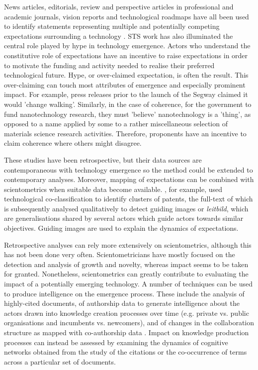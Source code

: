 \documentclass[11pt]{article}
\begin{document}
News articles, editorials, review and perspective articles in professional and academic journals, vision reports and technological roadmaps have all been used to identify statements representing multiple and potentially competing expectations surrounding a technology \citep[e.g.][]{Alkemade2012,VanLente2010,Bakker2011}.  STS work has also illuminated the central role played by hype in technology emergence. Actors who understand the constitutive role of expectations have an incentive to raise expectations in order to motivate the funding and activity needed to realise their preferred technological future. Hype, or over-claimed expectation, is often the result.  This over-claiming can touch most attributes of emergence and especially prominent impact. For example, press releases prior to the launch of the Segway claimed it would 'change walking'. Similarly, in the case of coherence, for the government to fund nanotechnology research, they must 'believe' nanotechnology is a 'thing', as opposed to a name applied by some to a rather miscellaneous selection of materials science research activities. Therefore, proponents have an incentive to claim coherence where others might disagree.

These studies have been retrospective, but their data sources are contemporaneous with technology emergence so the method could be extended to contemporary analyses.  Moreover, mapping of expectations can be combined with scientometrics when suitable data become available. \cite{Gustafsson2015}, for example, used technological co-classification to identify clusters of patents, the full-text of which is subsequently analysed qualitatively to detect guiding images or \textit{leitbild}, which are generalisations shared by several actors which guide actors towards similar objectives. Guiding images are used to explain the dynamics of expectations.

Retrospective analyses can rely more extensively on scientometrics, although this has not been done very often. Scientometricians have mostly focused on the detection and analysis of growth and novelty, whereas impact seems to be taken for granted. Nonetheless, scientometrics can greatly contribute to evaluating the impact of a potentially emerging technology. A number of techniques can be used to produce intelligence on the emergence process. These include the analysis of highly-cited documents, of authorship data to generate intelligence about the actors drawn into knowledge creation processes over time (e.g. private vs. public organisations and incumbents vs. newcomers), and of changes in the collaboration structure as mapped with co-authorship data \citep[e.g.][]{Hicks1986,Melin1996}. Impact on knowledge production processes can instead be assessed by examining the dynamics of cognitive networks obtained from the study of the citations or the co-occurrence of terms across a particular set of documents.
\end{document}

